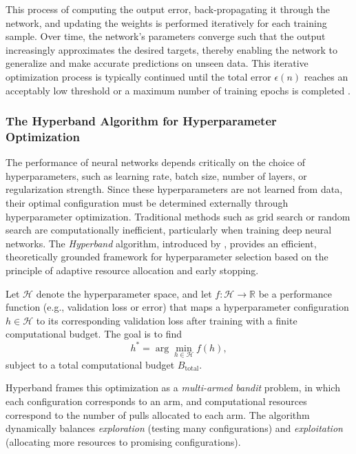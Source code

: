 This process of computing the output error, back-propagating it through the network, and updating the weights is performed iteratively for each training sample. Over time, the network's parameters converge such that the output increasingly approximates the desired targets, thereby enabling the network to generalize and make accurate predictions on unseen data. This iterative optimization process is typically continued until the total error $\epsilon(n)$ reaches an acceptably low threshold or a maximum number of training epochs is completed \parencite{sazli2006feedforwardnn}.

\subsubsection{The Hyperband Algorithm for Hyperparameter Optimization}
\label{subsec:hyperband_algorithm}

The performance of neural networks depends critically on the choice of hyperparameters, such as learning rate, batch size, number of layers, or regularization strength. Since these hyperparameters are not learned from data, their optimal configuration must be determined externally through hyperparameter optimization. Traditional methods such as grid search or random search are computationally inefficient, particularly when training deep neural networks. The \textit{Hyperband} algorithm, introduced by \textcite{li2017hyperband}, provides an efficient, theoretically grounded framework for hyperparameter selection based on the principle of adaptive resource allocation and early stopping.

Let $\mathcal{H}$ denote the hyperparameter space, and let $f : \mathcal{H} \rightarrow \mathbb{R}$ be a performance function (e.g., validation loss or error) that maps a hyperparameter configuration $h \in \mathcal{H}$ to its corresponding validation loss after training with a finite computational budget. The goal is to find
\begin{equation}
	h^* = \arg\min_{h \in \mathcal{H}} f(h),
	\label{eq:hyperband_objective}
\end{equation}
subject to a total computational budget $B_{\text{total}}$.

Hyperband frames this optimization as a \emph{multi-armed bandit} problem, in which each configuration corresponds to an arm, and computational resources correspond to the number of pulls allocated to each arm. The algorithm dynamically balances \textit{exploration} (testing many configurations) and \textit{exploitation} (allocating more resources to promising configurations).

